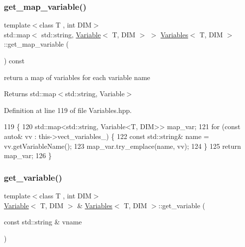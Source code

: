 \subsubsection{\texorpdfstring{get\+\_\+map\+\_\+variable()}{get\_map\_variable()}}
{\footnotesize\ttfamily template$<$class T , int D\+IM$>$ \\
std\+::map$<$ std\+::string, \hyperlink{classVariable}{Variable}$<$ T, D\+IM $>$ $>$ \hyperlink{classVariables}{Variables}$<$ T, D\+IM $>$\+::get\+\_\+map\+\_\+variable (\begin{DoxyParamCaption}{ }\end{DoxyParamCaption}) const}



return a map of variables for each variable name 

\begin{DoxyReturn}{Returns}
std\+::map$<$std\+::string, Variable$>$ 
\end{DoxyReturn}


Definition at line 119 of file Variables.\+hpp.


\begin{DoxyCode}
119                                                                               \{
120   std::map<std::string, Variable<T, DIM>> map\_var;
121   \textcolor{keywordflow}{for} (\textcolor{keyword}{const} \textcolor{keyword}{auto}& vv : this->vect\_variables\_) \{
122     \textcolor{keyword}{const} std::string& name = vv.getVariableName();
123     map\_var.try\_emplace(name, vv);
124   \}
125   \textcolor{keywordflow}{return} map\_var;
126 \}
\end{DoxyCode}
\mbox{\label{classVariables_a4ebd51b179445ea0d6b6276b9e90cfa6}} 
\subsubsection{\texorpdfstring{get\+\_\+variable()}{get\_variable()}}
{\footnotesize\ttfamily template$<$class T , int D\+IM$>$ \\
\hyperlink{classVariable}{Variable}$<$ T, D\+IM $>$ \& \hyperlink{classVariables}{Variables}$<$ T, D\+IM $>$\+::get\+\_\+variable (\begin{DoxyParamCaption}\item[{const std\+::string \&}]{vname }\end{DoxyParamCaption})}



